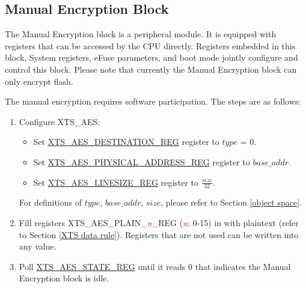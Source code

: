 \documentclass[main\_\_EN.tex]{subfiles}
\begin{document}
\subsection{Manual Encryption Block}

The Manual Encryption block is a peripheral module. It is equipped with registers that can be accessed by the CPU directly. Registers embedded in this block, System registers, eFuse parameters, and boot mode jointly configure and control this block. Please note that currently the Manual Encryption block can only encrypt flash.

The manual encryption requires software participation. The steps are as follows:

\begin{enumerate}

    \item \label{first step in xts}
        Configure XTS\_AES:
    \begin{itemize}
        \item Set \hyperref[regdesc:XTSAESDESTINATIONREG]{XTS\_AES\_DESTINATION\_REG} register to \begin{math}type\end{math} = 0.
        \item Set \hyperref[regdesc:XTSAESPHYSICALADDRESSREG]{XTS\_AES\_PHYSICAL\_ADDRESS\_REG} register to \begin{math}base\_addr\end{math}.
        \item Set \hyperref[regdesc:XTSAESLINESIZEREG]{XTS\_AES\_LINESIZE\_REG} register to \begin{math}\frac{size}{32}. \end{math}
    \end{itemize}
    For definitions of \begin{math}type\end{math}, \begin{math}base\_addr\end{math}, \begin{math}size\end{math}, please refer to Section \ref{object space}.

    \item Fill registers XTS\_AES\_PLAIN\_\textcolor{red}{\it{n}}\_REG (\textcolor{red}{\it{n}}: 0-15) in with plaintext (refer to Section \ref{XTS data rule}). Registers that are not used can be written into any value.

    \item Poll \hyperref[regdesc:XTSAESSTATEREG]{XTS\_AES\_STATE\_REG} until it reads 0 that indicates the Manual Encryption block is idle.


\end{enumerate}
\end{document}
